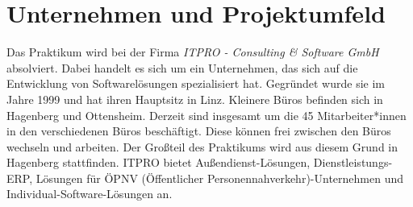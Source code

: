 \section{Unternehmen und Projektumfeld}
\label{sec:unternehmen}


	Das Praktikum wird bei der Firma \emph{ITPRO - Consulting \& Software GmbH} absolviert. Dabei handelt es sich um ein Unternehmen, das sich auf die Entwicklung von Softwarelösungen 
	spezialisiert hat. Gegründet wurde sie im Jahre 1999 und hat ihren Hauptsitz in Linz. Kleinere Büros befinden sich in Hagenberg und Ottensheim. Derzeit sind insgesamt um die 
	45 Mitarbeiter*innen in den verschiedenen Büros beschäftigt. Diese können frei zwischen den Büros wechseln und arbeiten. Der Großteil des Praktikums wird aus diesem Grund 
	in Hagenberg stattfinden.
	ITPRO bietet Außendienst-Lösungen, Dienstleistungs-ERP,  Lösungen für ÖPNV (Öffentlicher Personennahverkehr)-Unternehmen und Individual-Software-Lösungen an.

